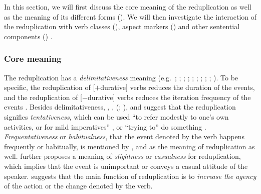 In this section, we will first discuss the core meaning of the reduplication as well as the meaning of its different forms ().
We will then investigate the interaction of the reduplication with verb classes (), aspect markers () and other sentential components () .

\subsubsection{Core meaning}\label{sec:core-sem}

The reduplication has a \textit{delimitativeness} meaning (e.g.\ \citealt[204--205]{Chao1968}; \citealt[232]{LiThompson1981};  \citealt[14]{Li1996}; \citealt[70]{Dai1997};  \citealt[382--383]{Zhu1998}; \citealt[420--421]{Xing2000}; \citealt[48]{Chen2001};  \citealt[288]{Tsao2001}; \citealt[11--12]{Yang2003}; \citealt[Sec. 4.3]{XiaoMcEnery2004}). 
To be specific, the reduplication of [$+$durative] verbs reduces the duration of the events,
and the reduplication of [$-$durative] verbs reduces the iteration frequency of the events \citetext{\citealp[14]{Li1996}; \citealp[149--150]{XiaoMcEnery2004}}.
Besides delimitativeness, \citet[204]{Chao1968}, \citet[276]{Fan1964}, \citeauthor{Smith1991} (\citeyear[356]{Smith1991}; \citeyear[199--120]{Smith1994}), \citet[14]{Li1996} and \citet[290--291]{Tsao2001} suggest that the reduplication signifies \textit{tentativeness}, which can be used
``to refer modestly to one's own activities, or for mild imperatives'' \citep[356]{Smith1991}, or ``trying to'' do something \citep[234]{LiThompson1981}.
\textit{Frequentativeness} or \textit{habitualness}, that the event denoted by the verb happens frequently or habitually, is mentioned by \citet[276]{Fan1964}, \citet[15]{Li1996} and \citet[1]{Qian2000} as the meaning of reduplication as well.
 \citet[276]{Fan1964} further proposes a meaning of \textit{slightness} or \textit{casualness} for reduplication, which implies that the event is unimportant or conveys a casual attitude of the speaker.
 \citet[Sec. 3.1.3]{Zhu1998} suggests that the main function of reduplication is to \textit{increase the agency} of the action or the change denoted by the verb.


